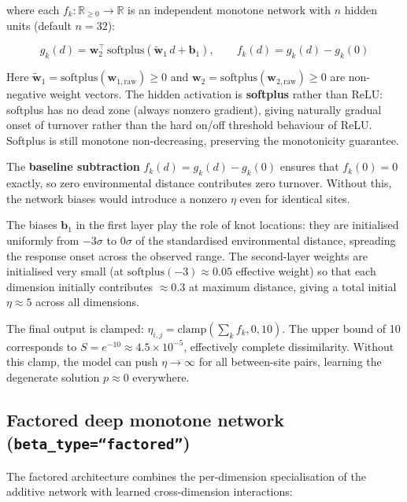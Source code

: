 \documentclass{article}
\begin{document}
where each $f_k: \mathbb{R}_{\geq 0} \to \mathbb{R}$ is an independent monotone network with $n$ hidden units (default $n = 32$):

\begin{equation}
    g_k(d) = \mathbf{w}_2^\top\,\text{softplus}\!\left(\tilde{\mathbf{w}}_1\, d + \mathbf{b}_1\right), \qquad f_k(d) = g_k(d) - g_k(0)
\end{equation}

Here $\tilde{\mathbf{w}}_1 = \text{softplus}(\mathbf{w}_{1,\text{raw}}) \geq 0$ and $\mathbf{w}_2 = \text{softplus}(\mathbf{w}_{2,\text{raw}}) \geq 0$ are non-negative weight vectors. The hidden activation is \textbf{softplus} rather than ReLU: softplus has no dead zone (always nonzero gradient), giving naturally gradual onset of turnover rather than the hard on/off threshold behaviour of ReLU. Softplus is still monotone non-decreasing, preserving the monotonicity guarantee.

The \textbf{baseline subtraction} $f_k(d) = g_k(d) - g_k(0)$ ensures that $f_k(0) = 0$ exactly, so zero environmental distance contributes zero turnover. Without this, the network biases would introduce a nonzero $\eta$ even for identical sites.

The biases $\mathbf{b}_1$ in the first layer play the role of knot locations: they are initialised uniformly from $-3\sigma$ to $0\sigma$ of the standardised environmental distance, spreading the response onset across the observed range. The second-layer weights are initialised very small (at $\text{softplus}(-3) \approx 0.05$ effective weight) so that each dimension initially contributes $\approx 0.3$ at maximum distance, giving a total initial $\eta \approx 5$ across all dimensions.

The final output is clamped: $\eta_{i,j} = \text{clamp}\!\left(\sum_k f_k, 0, 10\right)$. The upper bound of 10 corresponds to $S = e^{-10} \approx 4.5 \times 10^{-5}$, effectively complete dissimilarity. Without this clamp, the model can push $\eta \to \infty$ for all between-site pairs, learning the degenerate solution $p \approx 0$ everywhere.

\subsection{Factored deep monotone network (\texttt{beta\_type=``factored''})}
\label{sec:factored-beta}

The factored architecture combines the per-dimension specialisation of the additive network with learned cross-dimension interactions:
\end{document}
